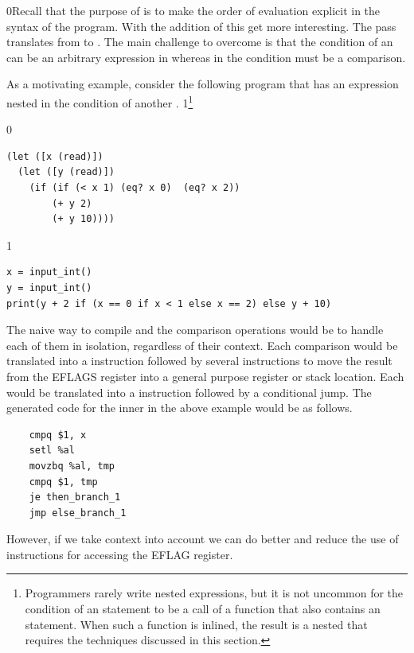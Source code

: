 \documentclass[7x10,nocrop]{TimesAPriori_MIT}%
\def\racketEd{0}
\def\pythonEd{1}
\def\edition{1}
\newcommand{\racket}[1]{{\if\edition\racketEd{#1}\fi}}
\newcommand{\python}[1]{{\if\edition\pythonEd #1\fi}}
\begin{document}
\racket{Recall that the purpose of  is to
  make the order of evaluation explicit in the syntax of the program.
  With the addition of \key{if} this get more interesting.}
%
The  pass translates from \LangIf{} to \LangCIf{}.
%
The main challenge to overcome is that the condition of an 
can be an arbitrary expression in \LangIf{} whereas in \LangCIf{} the
condition must be a comparison.

As a motivating example, consider the following program that has an
 expression nested in the condition of another .%
\python{\footnote{Programmers rarely write nested 
  expressions, but it is not uncommon for the condition of an
  \code{if} statement to be a call of a function that also contains an
  \code{if} statement.  When such a function is inlined, the result is
  a nested \code{if} that requires the techniques discussed in this
  section.}}
\begin{center}
\begin{minipage}{0.96\textwidth}
{\if\edition\racketEd        
\begin{lstlisting}
(let ([x (read)])
  (let ([y (read)])
    (if (if (< x 1) (eq? x 0)  (eq? x 2))
        (+ y 2)
        (+ y 10))))
\end{lstlisting}
\fi}
{\if\edition\pythonEd
\begin{lstlisting}
x = input_int()
y = input_int()
print(y + 2 if (x == 0 if x < 1 else x == 2) else y + 10)
\end{lstlisting}
\fi}
\end{minipage}
\end{center}
%
The naive way to compile  and the comparison operations would
be to handle each of them in isolation, regardless of their context.
Each comparison would be translated into a  instruction
followed by several instructions to move the result from the EFLAGS
register into a general purpose register or stack location. Each
 would be translated into a  instruction followed by
a conditional jump. The generated code for the inner  in the
above example would be as follows.
\begin{center}
\begin{minipage}{0.96\textwidth}
\begin{lstlisting}
    cmpq $1, x
    setl %al
    movzbq %al, tmp
    cmpq $1, tmp
    je then_branch_1
    jmp else_branch_1
\end{lstlisting}
\end{minipage}
\end{center}
However, if we take context into account we can do better and reduce
the use of  instructions for accessing the EFLAG register.
\end{document}
